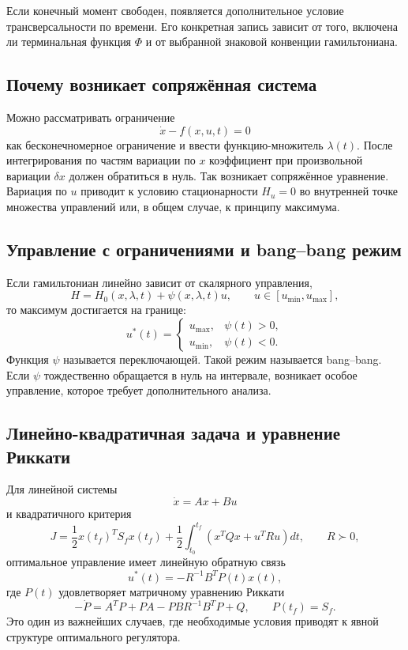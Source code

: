 Если конечный момент свободен, появляется дополнительное условие трансверсальности
по времени. Его конкретная запись зависит от того, включена ли терминальная функция
$\Phi$ и от выбранной знаковой конвенции гамильтониана.

\subsection{Почему возникает сопряжённая система}

Можно рассматривать ограничение
\[
    \dot x-f(x,u,t)=0
\]
как бесконечномерное ограничение и ввести функцию-множитель $\lambda(t)$. После
интегрирования по частям вариации по $x$ коэффициент при произвольной вариации
$\delta x$ должен обратиться в нуль. Так возникает сопряжённое уравнение. Вариация
по $u$ приводит к условию стационарности $H_u=0$ во внутренней точке множества
управлений или, в общем случае, к принципу максимума.

\subsection{Управление с ограничениями и bang--bang режим}

Если гамильтониан линейно зависит от скалярного управления,
\[
    H=H_0(x,\lambda,t)+\psi(x,\lambda,t)u,
    \qquad u\in[u_{\min},u_{\max}],
\]
то максимум достигается на границе:
\[
u^*(t)=
\begin{cases}
 u_{\max},&\psi(t)>0,\\
 u_{\min},&\psi(t)<0.
\end{cases}
\]
Функция $\psi$ называется переключающей. Такой режим называется bang--bang. Если
$\psi$ тождественно обращается в нуль на интервале, возникает особое управление,
которое требует дополнительного анализа.

\subsection{Линейно-квадратичная задача и уравнение Риккати}

Для линейной системы
\[
    \dot x=Ax+Bu
\]
и квадратичного критерия
\[
J=\frac12 x(t_f)^TS_fx(t_f)
+\frac12\int_{t_0}^{t_f}
\left(x^TQx+u^TRu\right)dt,
\qquad R\succ0,
\]
оптимальное управление имеет линейную обратную связь
\[
    u^*(t)=-R^{-1}B^TP(t)x(t),
\]
где $P(t)$ удовлетворяет матричному уравнению Риккати
\[
-\dot P=A^TP+PA-PBR^{-1}B^TP+Q,
\qquad P(t_f)=S_f.
\]
Это один из важнейших случаев, где необходимые условия приводят к явной структуре
оптимального регулятора.

